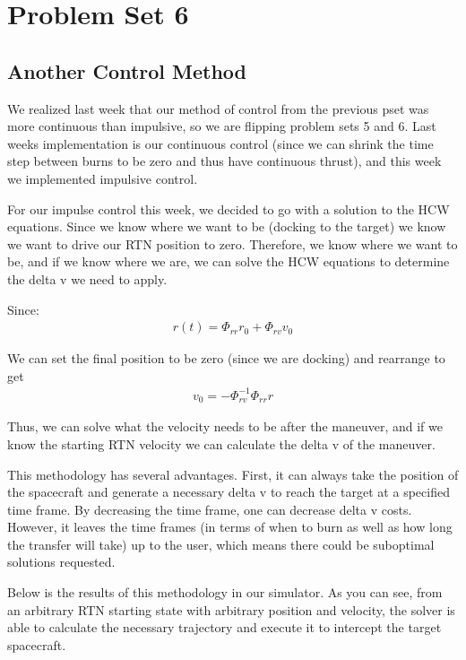 \section{Problem Set 6}

\subsection{Another Control Method}

We realized last week that our method of control from the previous pset was more continuous than impulsive, so we are flipping problem sets 5 and 6. Last weeks implementation is our continuous control (since we can shrink the time step between burns to be zero and thus have continuous thrust), and this week we implemented impulsive control.

For our impulse control this week, we decided to go with a solution to the HCW equations. Since we know where we want to be (docking to the target) we know we want to drive our RTN position to zero. Therefore, we know where we want to be, and if we know where we are, we can solve the HCW equations to determine the delta v we need to apply.

Since:
\begin{align}
r(t) = \Phi_{rr}r_0 + \Phi_{rv}v_0
\end{align}

We can set the final position to be zero (since we are docking) and rearrange to get
\begin{align}
v_0 = -\Phi_{rv}^{-1}\Phi_{rr}r
\end{align}

Thus, we can solve what the velocity needs to be after the maneuver, and if we know the starting RTN velocity we can calculate the delta v of the maneuver.

This methodology has several advantages. First, it can always take the position of the spacecraft and generate a necessary delta v to reach the target at a specified time frame. By decreasing the time frame, one can decrease delta v costs. However, it leaves the time frames (in terms of when to burn as well as how long the transfer will take) up to the user, which means there could be suboptimal solutions requested.

Below is the results of this methodology in our simulator. As you can see, from an arbitrary RTN starting state with arbitrary position and velocity, the solver is able to calculate the necessary trajectory and execute it to intercept the target spacecraft.


